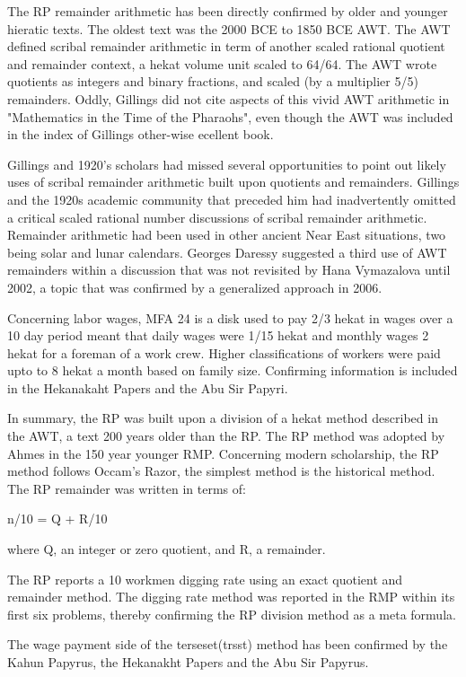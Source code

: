 \documentclass[12pt]{article}
\begin{document}
The RP remainder arithmetic has been directly confirmed by older and younger hieratic texts. The oldest text was the  2000 BCE to 1850 BCE AWT. The AWT defined scribal remainder arithmetic in term of another scaled rational quotient and remainder context, a hekat volume unit scaled to 64/64. The AWT wrote quotients as integers and binary fractions, and scaled (by a multiplier 5/5) remainders. Oddly, Gillings did not cite aspects of this vivid AWT arithmetic in "Mathematics in the Time of the Pharaohs", even though the AWT was included in the index of Gillings other-wise ecellent book. 

Gillings and 1920's scholars had missed several opportunities to point out likely uses of scribal remainder arithmetic built upon quotients and remainders. Gillings and the 1920s academic community that preceded him had inadvertently omitted a critical scaled rational number discussions of scribal remainder arithmetic. Remainder arithmetic had been used in other ancient Near East situations, two being solar and lunar calendars. Georges Daressy suggested a third use of AWT remainders within a discussion that was not revisited by Hana Vymazalova until 2002, a topic that was confirmed by a generalized approach in 2006.

Concerning labor wages, MFA 24 is a disk used to pay 2/3 hekat in wages over a 10 day period meant that daily wages were 1/15 hekat and monthly wages 2 hekat for a foreman of a work crew. Higher classifications of workers were paid upto to 8 hekat a month based on family size. Confirming information is included in the Hekanakaht Papers and the Abu Sir Papyri.

In summary, the RP was built upon a division of a hekat method described in the AWT, a text 200 years older than the RP. The RP method was adopted by Ahmes in the  150 year younger RMP. Concerning modern scholarship, the RP method follows Occam's Razor, the simplest method is the historical method. The RP remainder was written in terms of:

n/10 = Q + R/10

where Q, an integer or zero quotient, and R, a remainder.

The RP reports a 10 workmen digging rate using an exact quotient and remainder method. The digging rate method was reported in the RMP within its first six problems, thereby confirming the RP division method as a meta formula.

The wage payment side of the terseset(trsst) method has been confirmed by the Kahun Papyrus, the Hekanakht Papers and 
the Abu Sir Papyrus.
 
\end{document}
